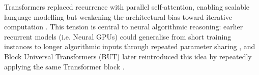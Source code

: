 \documentclass[10pt, letterpaper]{article} %
\begin{document}

Transformers replaced recurrence with parallel self-attention, enabling scalable language modelling but weakening the architectural bias toward iterative computation \cite{vaswani2017attention}. This tension is central to neural algorithmic reasoning: earlier recurrent models (i.e. Neural GPUs) could generalise from short training instances to longer algorithmic inputs through repeated parameter sharing \cite{kaiser2016neural}, and Block Universal Transformers (BUT) later reintroduced this idea by repeatedly applying the same Transformer block \cite{dehghani2019universal}. 
\end{document}
